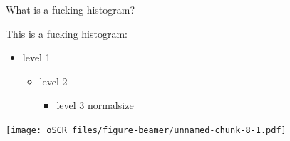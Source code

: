 \begin{frame}[fragile]{What is a fucking histogram?}

This is a fucking histogram:

\begin{itemize}[<+->]
\tightlist
\item
  level 1

  \begin{itemize}[<+->]
  \tightlist
  \item
    level 2

    \begin{itemize}[<+->]
    \tightlist
    \item
      level 3 normalsize
    \end{itemize}
  \end{itemize}
\end{itemize}

\begin{Shaded}
\begin{Highlighting}[]
\NormalTok{(}\NormalTok{(}\NormalTok{))}
\end{Highlighting}
\end{Shaded}

\texttt{[image: oSCR\_files/figure-beamer/unnamed-chunk-8-1.pdf]}

\end{frame}

